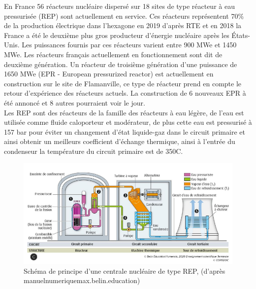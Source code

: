 \documentclass[a4paper,11pt]{report}    %
\begin{document}
En France 56 réacteurs nucléaire dispersé sur 18 sites de type réacteur à eau pressurisée (REP) sont actuellement en service. Ces réacteurs représentent 70\% de la production électrique dans l'hexagone en 2019 d'après RTE et en 2018 la France a été le deuxième plus gros producteur d'énergie nucléaire après les États-Unis. Les puissances fournis par ces réacteurs varient entre 900 MWe et 1450 MWe. Les réacteurs français actuellement en fonctionnement sont dit de deuxième génération. Un réacteur de troisième génération d'une puissance de 1650 MWe (EPR - European pressurized reactor) est actuellement en construction sur le site de Flamanville, ce type de réacteur prend en compte le retour d'expérience des réacteurs actuels. La construction de 6 nouveaux EPR à été annoncé et 8 autres pourraient voir le jour. \\


Les REP sont des réacteurs de la famille des réacteurs à eau légère, de l'eau est utilisée comme fluide caloporteur et modérateur, de plus cette eau est pressurisé à 157 bar pour éviter un changement d'état liquide-gaz dans le circuit primaire et ainsi obtenir un meilleurs coefficient d'échange thermique, ainsi à l'entrée du condenseur la température du circuit primaire est de 350\textdegree C.
\begin{figure}[h!]
	\centering
	\includegraphics[width=0.8\linewidth]{figure/sch_centrale1}
	\caption[Schéma de principe d'une centrale nucléaire de type REP]{Schéma de principe d'une centrale nucléaire de type REP, (d'après manuelnumeriquemax.belin.education)}
	\label{fig:schcentrale1}
\end{figure}
\end{document}
